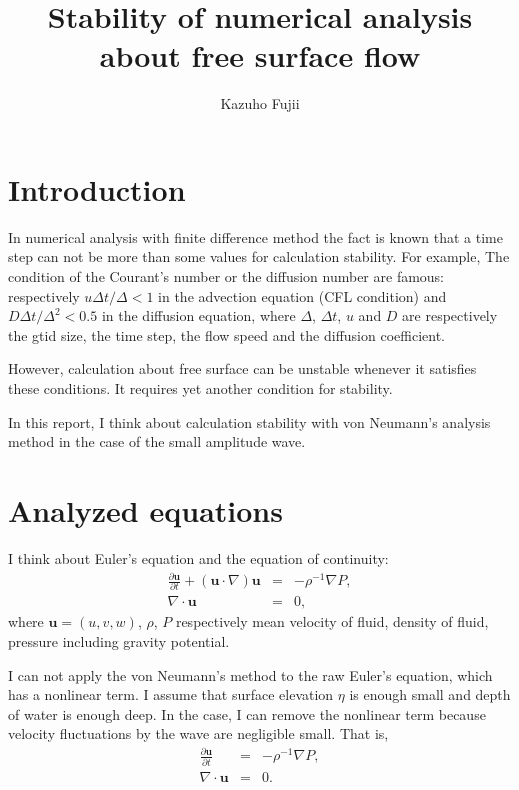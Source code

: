 \documentclass[a4paper,11pt]{article}
\title{Stability of numerical analysis about free surface flow}
\author{Kazuho Fujii}
\date{}
\begin{document}
\maketitle

\section{Introduction}
In numerical analysis with finite difference method the fact is known
that a time step can not be more than some values for calculation
stability. For example, The condition of the Courant's number or the
diffusion number are famous: respectively $u\Delta t/\Delta < 1$ in
the advection equation (CFL condition) and $D\Delta t/\Delta^2 <
0.5$ in the diffusion equation, where $\Delta$, $\Delta t$, $u$ and $D$
are respectively the gtid size, the time step, the flow speed and the
diffusion coefficient.

However, calculation about free surface can be unstable whenever it satisfies these conditions. It requires yet another condition for stability.

In this report, I think about calculation stability with von Neumann's analysis method in the case of the small amplitude wave.

\section{Analyzed equations}

I think about Euler's equation and the equation of continuity:
\begin{eqnarray}
\frac{\partial \bm{u}}{\partial t}
 + (\bm{u} \cdot \nabla)\bm{u}
&=& - \rho^{-1}\nabla P, \\
\nabla \cdot \bm{u} &=& 0,
\end{eqnarray}
where $\bm{u}=(u,v,w)$, $\rho$, $P$ respectively mean velocity of fluid, density of fluid, pressure including gravity potential.

I can not apply the von Neumann’s method to the raw Euler’s equation,
which has a nonlinear term. I assume that surface elevation $\eta$ is
enough small and depth of water is enough deep. In the case, I can
remove the nonlinear term because velocity fluctuations by the wave are
negligible small. That is,
\begin{eqnarray}
\frac{\partial \bm{u}}{\partial t}
&=& - \rho^{-1}\nabla P, \label{linear-euler}\\
\nabla \cdot \bm{u} &=& 0.
\end{eqnarray}
\end{document}
